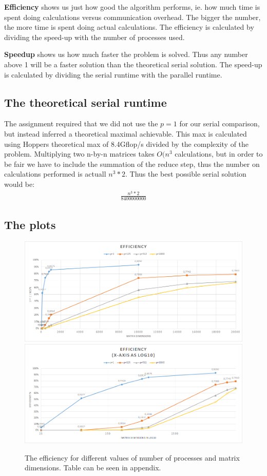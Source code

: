\documentclass[a4paper,11pt,oneside]{book}
\begin{document}
\textbf{Efficiency} shows us just how good the algorithm performs, ie. how much time is spent doing calculations versus communication overhead. The bigger the number, the more time is spent doing actual calculations. The efficiency is calculated by dividing the speed-up with the number of processes used.

\textbf{Speedup} shows us how much faster the problem is solved. Thus any number above 1 will be a faster solution than the theoretical serial solution. The speed-up is calculated by dividing the serial runtime with the parallel runtime.

\subsection{The theoretical serial runtime}
The assignment required that we did not use the $p=1$ for our serial comparison, but instead inferred a theoretical maximal achievable. This max is calculated using Hoppers theoretical max of 8.4Gflop/s divided by the complexity of the problem. Multiplying two n-by-n matrices takes $O(n^{3}$ calculations, but in order to be fair we have to include the summation of the reduce step, thus the number on calculations performed is actuall $n^{3} * 2$. Thus the best possible serial solution would be:
\begin{align*}
\frac{n^{3}*2}{8400000000}
\end{align*}

\subsection{The plots}

\begin{figure}[H]
  \centering
  \includegraphics[width=0.9\linewidth]{plots-eff2.png}
  \includegraphics[width=0.9\linewidth]{plots-eff1.png}
  \caption{The efficiency for different values of number of processes and matrix dimensions. Table can be seen in appendix.}
  \centering
  \label{fig:sub1}
\end{figure}
\end{document}
